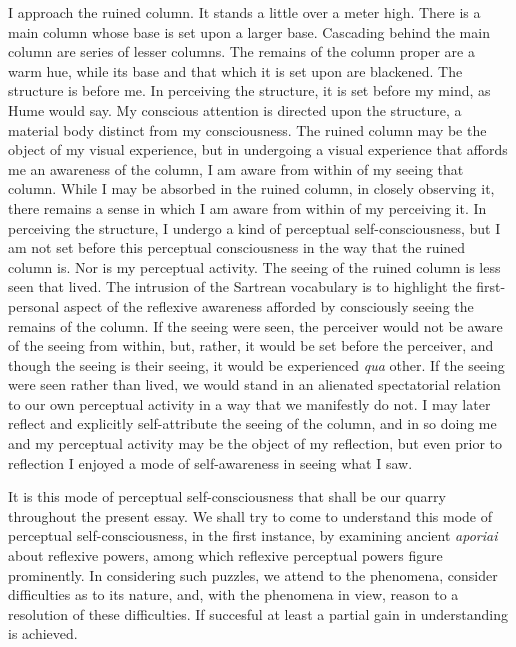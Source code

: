 I approach the ruined column. It stands a little over a meter high. There is a main column whose base is set upon a larger base. Cascading behind the main column are series of lesser columns. The remains of the column proper are a warm hue, while its base and that which it is set upon are blackened. The structure is before me. In perceiving the structure, it is set before my mind, as Hume would say. My conscious attention is directed upon the structure, a material body distinct from my consciousness. The ruined column may be the object of my visual experience, but in undergoing a visual experience that affords me an awareness of the column, I am aware from within of my seeing that column. While I may be absorbed in the ruined column, in closely observing it, there remains a sense in which I am aware from within of my perceiving it. In perceiving the structure, I undergo a kind of perceptual self-consciousness, but I am not set before this perceptual consciousness in the way that the ruined column is. Nor is my perceptual activity. The seeing of the ruined column is less seen that lived. The intrusion of the Sartrean vocabulary is to highlight the first-personal aspect of the reflexive awareness afforded by consciously seeing the remains of the column. If the seeing were seen, the perceiver would not be aware of the seeing from within, but, rather, it would be set before the perceiver, and though the seeing is their seeing, it would be experienced \emph{qua} other. If the seeing were seen rather than lived, we would stand in an alienated spectatorial relation to our own perceptual activity in a way that we manifestly do not. I may later reflect and explicitly self-attribute the seeing of the column, and in so doing me and my perceptual activity may be the object of my reflection, but even prior to reflection I enjoyed a mode of self-awareness in seeing what I saw. 

It is this mode of perceptual self-consciousness that shall be our quarry throughout the present essay. We shall try to come to understand this mode of perceptual self-consciousness, in the first instance, by examining ancient \emph{aporiai} about reflexive powers, among which reflexive perceptual powers figure prominently. In considering such puzzles, we attend to the phenomena, consider difficulties as to its nature, and, with the phenomena in view, reason to a resolution of these difficulties. If succesful at least a partial gain in understanding is achieved.

